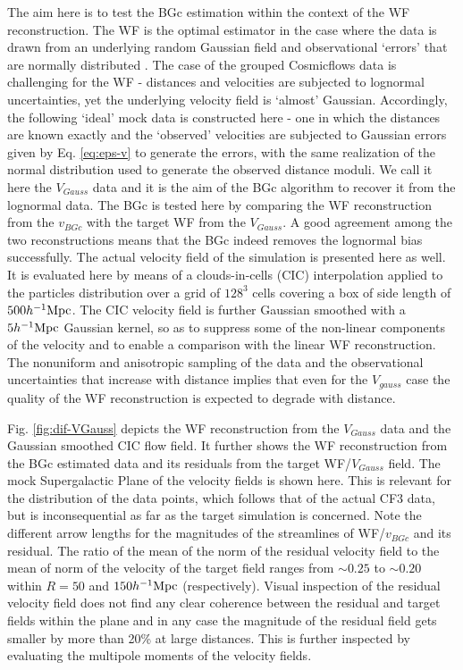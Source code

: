 \documentclass[useAMS,usenatbib]{mn2e}
\newcommand{\hmpc}{{\ifmmode{h^{-1}{\rm Mpc}}\else{$h^{-1}$Mpc}\fi}}
\begin{document}
The aim here  is  to test the BGc estimation within the context   of the WF  reconstruction. 
The WF is the optimal estimator in the case where the data is drawn from an underlying random Gaussian field and observational `errors' that are normally distributed  \citep{1995ApJ...449..446Z}.  The case of  the grouped Cosmicflows data is challenging for the WF - distances  and velocities are subjected 
to lognormal uncertainties, yet the underlying velocity field is `almost' Gaussian. Accordingly,  the following  `ideal' mock data is constructed here - one in which the distances are known exactly and the `observed' velocities are  subjected to Gaussian errors given by Eq.   \ref{eq:eps-v} to generate the errors, with the same realization of the normal distribution used to generate the observed distance moduli. We call it here the $V_{Gauss}$ data and it is the aim of the BGc algorithm to recover it from the lognormal data. The BGc is tested here by comparing the WF reconstruction from the $v_{BGc}$ with the target WF  from the $V_{Gauss}$. A good  agreement  among the two reconstructions  means that the BGc indeed removes the lognormal bias successfully. The actual velocity field of the simulation is presented here as well. It is evaluated here by means of a clouds-in-cells (CIC) interpolation applied to the particles distribution over a grid of $128^3$ cells covering a box of side length of $500\hmpc$. The CIC velocity field is further Gaussian smoothed with a $5\hmpc$ Gaussian kernel, so as to suppress some of the non-linear components  of the velocity and to enable a comparison with the linear WF reconstruction. The nonuniform and anisotropic sampling of the data and the observational uncertainties that increase with distance implies that even for the $V_{gauss}$ case the quality of the WF reconstruction is expected to degrade with distance.

Fig. \ref{fig:dif-VGauss}  depicts the WF reconstruction from the $V_{Gauss}$ data and the Gaussian smoothed CIC flow field. It further shows the WF reconstruction from the BGc estimated data and its residuals   from the target  WF/$V_{Gauss}$ field. The mock Supergalactic Plane of the velocity fields is shown here. 
This is relevant for the distribution of the data points, which follows that of the actual CF3 data, but is inconsequential  as far as the target simulation is concerned.
Note the different arrow lengths for the magnitudes of the streamlines of  WF/$v_{BGc}$  and its residual. The ratio of the mean  of the norm of the residual velocity field to the mean of norm of the velocity of the target field ranges from $\sim 0.25$ to $\sim 0.20$ within    $R=50$ and $150\hmpc$ (respectively). Visual inspection of the residual velocity field does not find any  clear coherence between the residual and target fields within the plane and in any case the magnitude of the residual field gets smaller by more than 20\% at large  distances. This is further inspected by evaluating the  multipole moments of the velocity fields.
\end{document}
